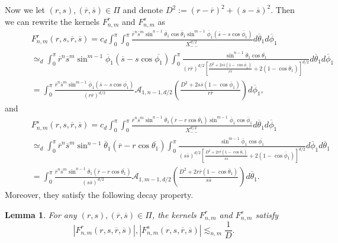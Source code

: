 \documentclass[11pt]{amsart}
\newtheorem{lem}[theorem]{Lemma}
\theoremstyle{definition}
\theoremstyle{remark}
\numberwithin{equation}{section}
\numberwithin{equation}{section}
\newcommand{\br}[1]{\overline{#1}}
\newcommand{\0}{\emptyset}
\newcommand{\tht}{\theta}
\newcommand{\calA}{\mathcal A}
\begin{document}
	Now we let $(r,s), (\br{r},\br{s})\in \Pi$ and denote $D^{2}:=(r-\br{r})^{2}+(s-\br{s})^{2}$. Then we can rewrite the kernels $ F_{n,m}^{r} $ and $F_{n,m}^{s}$ as
	\begin{equation}\label{eq:Fnmr}
		\begin{aligned}
			&F_{n,m}^{r}(r,s,\br{r},\br{s})=c_{d}\int_{0}^{\pi}\int_{0}^{\pi}%
			\frac{\br{r}^{n}\br{s}^{m}\sin^{n-1}\br{\tht}_{1}\cos\br{\tht}_{1}\sin^{m-1}\br{\phi}_{1}(\br{s}-s\cos\br{\phi}_{1})}{X_{--}^{d/2}}d\br{\tht}_{1}%
			d\br{\phi}_{1}\\%
			\qquad&\simeq_{d}\int_{0}^{\pi}\br{r}^{n}\br{s}^{m}\sin^{m-1}\br{\phi}_{1}(\br{s}-s\cos\br{\phi_{1}})\int_{0}^{\pi}\frac{\sin^{n-1}\br{\tht}_{1}\cos\br{\tht_{1}}}{(r\br{r})^{d/2}\left[\frac{D^{2}+2s\br{s}(1-\cos\br{\phi}_{1})}{r\br{r}}+2(1-\cos\br{\tht}_{1})\right]^{d/2}}d\br{\tht}_{1}d\br{\phi}_{1}\\
			\qquad&=\int_{0}^{\pi}\frac{\br{r}^{n}\br{s}^{m}\sin^{m-1}\br{\phi}_{1}(\br{s}-s\cos\br{\phi_{1}})}{(r\br{r})^{d/2}}\calA_{1,n-1,d/2}\left(\frac{D^{2}+2s\br{s}(1-\cos\br{\phi}_{1})}{r\br{r}}\right)d\br{\phi}_{1},
		\end{aligned}
	\end{equation}
	and
	\begin{equation}\label{eq:Fnms}
		\begin{aligned}
			&F_{n,m}^{s}(r,s,\br{r},\br{s})=c_{d}\int_{0}^{\pi}\int_{0}^{\pi}%
			\frac{\br{r}^{n}\br{s}^{m}\sin^{n-1}\br{\tht}_{1}(\br{r}-r\cos\br{\tht}_{1})\sin^{m-1}\br{\phi}_{1}\cos\br{\phi}_{1}}{X_{--}^{d/2}}d\br{\tht}_{1}%
			d\br{\phi}_{1}\\%
			\qquad&\simeq_{d}\int_{0}^{\pi}\br{r}^{n}\br{s}^{m}\sin^{n-1}\br{\tht}_{1}(\br{r}-r\cos\br{\tht_{1}})\int_{0}^{\pi}\frac{\sin^{m-1}\br{\phi}_{1}\cos\br{\phi_{1}}}{(s\br{s})^{d/2}\left[\frac{D^{2}+2r\br{r}(1-\cos\br{\tht}_{1})}{s\br{s}}+2(1-\cos\br{\phi}_{1})\right]^{d/2}}d\br{\phi}_{1}d\br{\tht}_{1}\\
			\qquad&=\int_{0}^{\pi}\frac{\br{r}^{n}\br{s}^{m}\sin^{n-1}\br{\tht}_{1}(\br{r}-r\cos\br{\tht_{1}})}{(s\br{s})^{d/2}}\calA_{1,m-1,d/2}\left(\frac{D^{2}+2r\br{r}(1-\cos\br{\tht}_{1})}{s\br{s}}\right)d\br{\tht}_{1}.
		\end{aligned}
	\end{equation}
	Moreover, they satisfy the following decay property.
	\begin{lem}\label{lem:Frslow}
		For any $(r,s), (\br{r},\br{s})\in \Pi$, the kernels $F_{n,m}^{r}$ and $F_{n,m}^{s}$ satisfy
		\begin{equation}\label{eq:Frslow}
			|F_{n,m}^{r}(r,s,\br{r},\br{s})|, |F_{n,m}^{s}(r,s,\br{r},\br{s})|\lesssim_{n,m} \frac{1}{D}.%
		\end{equation} 
	\end{lem}
	
\end{document}
